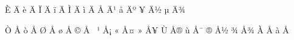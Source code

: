 \mubyte ^^c8  ^^c4^^8c\endmubyte %
\mubyte ^^e8  ^^c4^^8d\endmubyte %
\mubyte ^^cf  ^^c4^^8e\endmubyte %
\mubyte ^^ef  ^^c4^^8f\endmubyte %
\mubyte ^^cc  ^^c4^^9a\endmubyte %
\mubyte ^^ec  ^^c4^^9b\endmubyte %
\mubyte ^^c5  ^^c4^^b9\endmubyte %
\mubyte ^^e5  ^^c4^^ba\endmubyte %
\mubyte ^^a5  ^^c4^^bd\endmubyte %
\mubyte ^^b5  ^^c4^^be\endmubyte %

\mubyte ^^d2  ^^c5^^87\endmubyte %
\mubyte ^^f2  ^^c5^^88\endmubyte %
\mubyte ^^d8  ^^c5^^98\endmubyte %
\mubyte ^^f8  ^^c5^^99\endmubyte %
\mubyte ^^a9  ^^c5^^a0\endmubyte %
\mubyte ^^b9  ^^c5^^a1\endmubyte %
\mubyte ^^ab  ^^c5^^a4\endmubyte %
\mubyte ^^bb  ^^c5^^a5\endmubyte %
\mubyte ^^d9  ^^c5^^ae\endmubyte %
\mubyte ^^f9  ^^c5^^af\endmubyte %
\mubyte ^^ae  ^^c5^^bd\endmubyte %
\mubyte ^^be  ^^c5^^be\endmubyte %
\mubyte ^^c0  ^^c5^^94\endmubyte %
\mubyte ^^e0  ^^c5^^95\endmubyte %



 



\endinput

